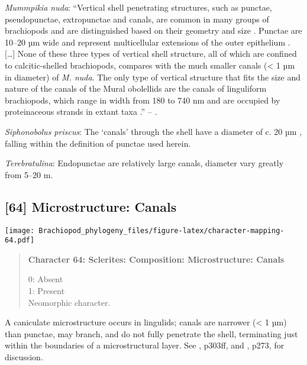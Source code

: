 \documentclass[openany]{book}
\theoremstyle{definition}
\theoremstyle{definition}
\theoremstyle{definition}
\theoremstyle{remark}
\begin{document}
\hypertarget{Mummpikia_nuda-coding-63}{}
\emph{Mummpikia nuda}: ``Vertical shell penetrating structures, such as
punctae, pseudopunctae, extropunctae and canals, are common in many
groups of brachiopods and are distinguished based on their geometry and
size \citep{Williams1997Introduction}. Punctae are 10--20 µm wide and
represent multicellular extensions of the outer epithelium
\citep{Owen1969Thecaecum}. {[}\ldots{}{]} None of these three types of
vertical shell structure, all of which are confined to calcitic-shelled
brachiopods, compares with the much smaller canals (\textless{} 1 µm in
diameter) of \emph{M. nuda}. The only type of vertical structure that
fits the size and nature of the canals of the Mural obolellids are the
canals of linguliform brachiopods, which range in width from 180 to 740
nm and are occupied by proteinaceous strands in extant taxa
\citetext{\citealp[1994]{Williams1992Structureof}; \citealp{Williams1997Introduction}}.''
-- \citet{Balthasar2008iMummpikia}.

\hypertarget{Siphonobolus_priscus-coding-63}{}
\emph{Siphonobolus priscus}: The `canals' through the shell have a
diameter of c. 20 µm \citep[text-fig. 2a]{Williams2004Chemicostructure},
falling within the definition of punctae used herein.

\hypertarget{Terebratulina-coding-63}{}
\emph{Terebratulina}: Endopunctae are relatively large canals, diameter
vary greatly from 5--20 m.

\subsection*{{[}64{]} Microstructure:
Canals}\label{microstructure-canals}

\texttt{[image: Brachiopod\_phylogeny\_files/figure-latex/character-mapping-64.pdf]}

\begin{quote}
\textbf{Character 64: Sclerites: Composition: Microstructure: Canals}

0: Absent\\
1: Present\\
Neomorphic character.
\end{quote}

A caniculate microstructure occurs in lingulids; canals are narrower
(\textless{} 1 µm) than punctae, may branch, and do not fully penetrate
the shell, terminating just within the boundaries of a microstructural
layer. See \citet{Williams1997Introduction}, p303ff, and
\citet{Balthasar2008iMummpikia}, p273, for discussion.
\end{document}
